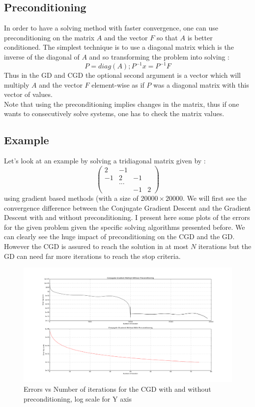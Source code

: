 \documentclass[a4paper]{report}
\begin{document}
\subsection{Preconditioning}\label{precon}
In order to have a solving method with faster convergence, one can use preconditioning on the matrix $A$ and the vector $F$ so that $A$ is better conditioned. The simplest technique is to use a diagonal matrix which is the inverse of the diagonal of $A$ and so transforming the problem into solving :
\[
P=diag(A);P^{-1}x=P^{-1}F
\]
Thus in the GD and CGD the optional second argument is a vector which will multiply $A$ and the vector $F$ element-wise as if $P$ was a diagonal matrix with this vector of values. \\
Note that using the preconditioning implies changes in the matrix, thus if one wants to consecutively solve systems, one has to check the matrix values.



\subsection{Example}
Let's look at an example by solving a tridiagonal matrix given by :
\[
\left(
\begin{matrix}
2&-1&&\\
-1&2&-1&\\
&...&&\\
&&-1&2
\end{matrix}
\right)
\]
using gradient based methods (with a size of $20000\times20000$. We will first see the convergence difference between the Conjugate Gradient Descent and the Gradient Descent with and without preconditioning.
I present here some plots of the errors for the given problem given the specific solving algorithms presented before. We can clearly see the huge impact of preconditioning on the CGD and the GD. However the CGD is assured to reach the solution in at most $N$ iterations but the GD can need far more iterations to reach the stop criteria.
\begin{figure}[H]
\begin{center}
\includegraphics[scale=0.20]{cgd_error.png}\caption{Errors vs Number of iterations for the CGD with and without preconditioning, log scale for Y axis}
\end{center}
\end{figure}
\end{document}
